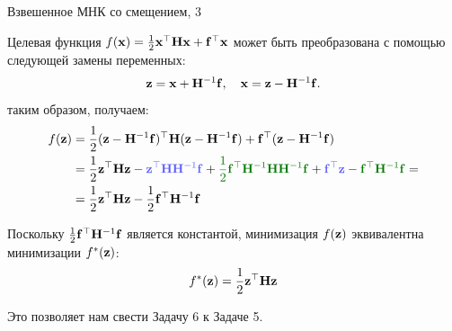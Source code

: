 \documentclass{beamer}
\begin{document}
\begin{frame}{Взвешенное МНК со смещением, 3}
	\begin{flushleft}
		
		Целевая функция $f(\mathbf{x}) = \frac{1}{2} \mathbf{x}^\top \mathbf{H} \mathbf{x} + \mathbf{f}^\top \mathbf{x}$ может быть преобразована с помощью следующей замены переменных:
		\begin{align}
			\mathbf{z} = \mathbf{x} + \mathbf{H}^{-1}\mathbf{f}, \ \ \ \mathbf{x} = \mathbf{z} - \mathbf{H}^{-1}\mathbf{f}.
		\end{align}
		таким образом, получаем:
		\begin{align*}
			f(\bo{z}) &= \frac{1}{2} (\bo{z} - \bo{H}^{-1}\bo{f})\T \bo{H} (\bo{z} - \bo{H}^{-1}\bo{f}) + \bo{f}\T (\bo{z} - \bo{H}^{-1}\bo{f})
			\\
			&= \frac{1}{2} \bo{z}\T \bo{H} \bo{z} - 
			\textcolor{myblue}{\bo{z}\T \bo{H} \bo{H}^{-1}\bo{f}} + 
			\textcolor{mydarkgreen}{\frac{1}{2} \bo{f}\T \bo{H}^{-1}\bo{H} \bo{H}^{-1}\bo{f}} + 
			\textcolor{myblue}{\bo{f}\T \bo{z}} - \textcolor{mydarkgreen}{\bo{f}\T\bo{H}^{-1}\bo{f}} =
			\\
			&= \frac{1}{2} \bo{z}\T \bo{H} \bo{z}  - \frac{1}{2} \bo{f}\T \bo{H}^{-1}\bo{f}
		\end{align*}
		
		Поскольку $ \frac{1}{2} \mathbf{f}^\top \mathbf{H}^{-1}\mathbf{f}$ является константой, минимизация $f(\mathbf{z})$ эквивалентна минимизации $f^*(\mathbf{z})$:
		\begin{align*}
			f^*(\mathbf{z}) =  \frac{1}{2} \mathbf{z}^\top \mathbf{H} \mathbf{z}
		\end{align*}
		
		Это позволяет нам свести Задачу 6 к Задаче 5.
		
		
	\end{flushleft}
\end{frame}
\end{document}
